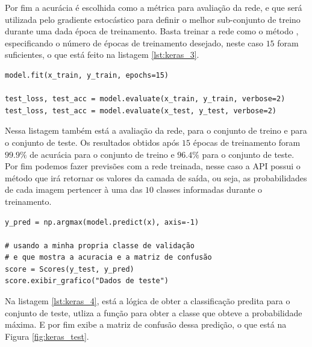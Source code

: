 Por fim a acurácia é escolhida como a métrica para avaliação da rede, e que será utilizada pelo gradiente estocástico para definir o melhor sub-conjunto de treino durante uma dada época de treinamento. Basta treinar a rede como o método , especificando o número de épocas de treinamento desejado, neste caso $15$ foram suficientes, o que está feito na listagem \ref{lst:keras_3}.

\begin{scriptsize}
\estiloR
\begin{lstlisting}[caption={Trecho do script \eng{mnist\_keras.py}}, label={lst:keras_3}, escapeinside={\%}]
model.fit(x_train, y_train, epochs=15)

test_loss, test_acc = model.evaluate(x_train, y_train, verbose=2)
test_loss, test_acc = model.evaluate(x_test, y_test, verbose=2)
\end{lstlisting}
\end{scriptsize}

Nessa listagem também está a avaliação da rede, para o conjunto de treino e para o conjunto de teste. Os resultados obtidos após $15$ épocas de treinamento foram $99.9\%$ de acurácia para o conjunto de treino e $96.4\%$ para o conjunto de teste. Por fim podemos fazer previsões com a rede treinada, nesse caso a API possui o método  que irá retornar os valores da camada de saída, ou seja, as probabilidades de cada imagem pertencer à uma das $10$ classes informadas durante o treinamento.

\begin{scriptsize}
\estiloR
\begin{lstlisting}[caption={Trecho do script \eng{mnist\_keras.py}}, label={lst:keras_4}, escapeinside={\%}]
y_pred = np.argmax(model.predict(x), axis=-1)

# usando a minha propria classe de validação
# e que mostra a acuracia e a matriz de confusão
score = Scores(y_test, y_pred)
score.exibir_grafico("Dados de teste")
\end{lstlisting}
\end{scriptsize}

Na listagem \ref{lst:keras_4}, está a lógica de obter a classificação predita para o conjunto de teste, utliza a função  para obter a classe que obteve a probabilidade máxima. E por fim exibe a matriz de confusão dessa predição, o que está na Figura \ref{fig:keras_test}.

